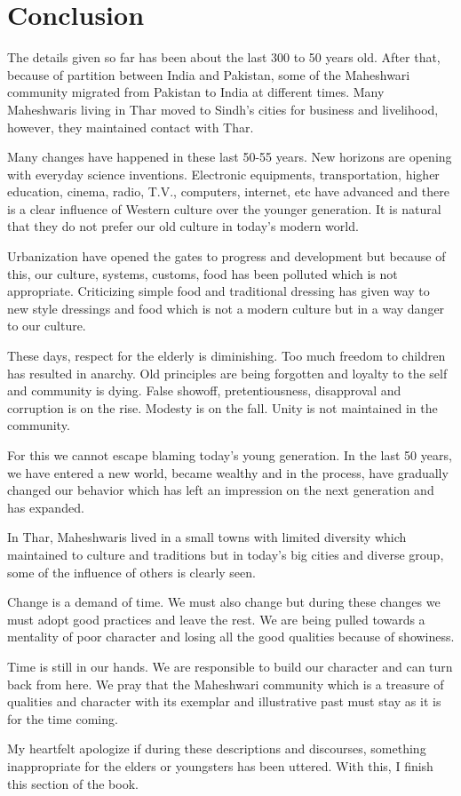 \chapter{Conclusion}

The details given so far has been about the last 300 to 50 years old. After
that, because of partition between India and Pakistan, some of the Maheshwari
community migrated from Pakistan to India at different times. Many Maheshwaris
living in Thar moved to Sindh's cities for business and livelihood, however,
they maintained contact with Thar. 

Many changes have happened in these last 50-55 years. New horizons are opening
with everyday science inventions. Electronic equipments, transportation, higher
education, cinema, radio, T.V., computers, internet, etc have advanced and
there is a clear influence of Western culture over the younger generation. It
is natural that they do not prefer our old culture in today's modern world. 

Urbanization have opened the gates to progress and development but because of
this, our culture, systems, customs, food has been polluted which is not
appropriate. Criticizing simple food and traditional dressing has given way to
new style dressings and food which is not a modern culture but in a way danger
to our culture.

These days, respect for the elderly is diminishing. Too much freedom to
children has resulted in anarchy. Old principles are being forgotten and
loyalty to the self and community is dying. False showoff, pretentiousness,
disapproval and corruption is on the rise. Modesty is on the fall. Unity is not
maintained in the community. 

For this we cannot escape blaming today's young generation. In the last 50
years, we have entered a new world, became wealthy and in the process, have
gradually changed our behavior which has left an impression on the next
generation and has expanded. 

In Thar, Maheshwaris lived in a small towns with limited diversity which
maintained to culture and traditions but in today's big cities and diverse
group, some of the influence of others is clearly seen. 

Change is a demand of time. We must also change but during these changes we
must adopt good practices and leave the rest. We are being pulled towards a
mentality of poor character and losing all the good qualities because of
showiness.

Time is still in our hands. We are responsible to build our character and can
turn back from here. We pray that the Maheshwari community which is a treasure
of qualities and character with its exemplar and illustrative past must stay as
it is for the time coming.

My heartfelt apologize if during these descriptions and discourses, something
inappropriate for the elders or youngsters has been uttered. With this, I
finish this section of the book. 
